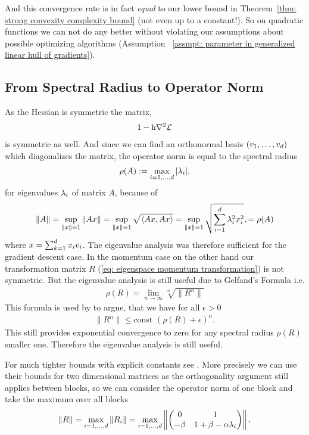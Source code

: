 And this convergence rate is in fact \emph{equal} to our lower bound  in
Theorem~\ref{thm: strong convexity complexity bound} (not even up to a
constant!). So on quadratic functions we can not do any better without violating
our assumptions about possible optimizing algorithms (Assumption~ \ref{assmpt:
parameter in generalized linear hull of gradients}).

\subsection{From Spectral Radius to Operator Norm}

As the Hessian is symmetric the matrix,
\begin{align*}
	1-\text{h} \nabla^2\mathcal{L}
\end{align*}
is symmetric as well. And since we can find an orthonormal basis \((v_1,\dots,
v_d)\) which diagonalizes the matrix, the operator norm is equal
to the spectral radius
\begin{align*}
	\rho(A)
	:= \max_{i=1,\dots,d} |\lambda_i|,
\end{align*}
for eigenvalues \(\lambda_i\) of matrix \(A\), because of
\begin{align*}
	\|A\| = \sup_{\|x\| =1} \|Ax\|
	= \sup_{\|x\| =1} \sqrt{\langle Ax, Ax\rangle}
	= \sup_{\|x\| =1} \sqrt{\sum_{i=1}^d \lambda_i^2 x_i^2},
	= \rho(A)
\end{align*}
where \(x=\sum_{k=1}^d x_i v_i\). The eigenvalue analysis was therefore
sufficient for the gradient descent case. In the momentum case on the other
hand our transformation matrix \(R\) (\ref{eq: eigenspace momentum transformation})
is not symmetric. But the eigenvalue analysis is still useful due to Gelfand's Formula
\parencite{gelfandNormierteRinge1941} i.e.
\begin{align*}
	\rho(R) = \lim_{n\to\infty}\sqrt[n]{\|R^n\|}
\end{align*}
This formula is used by \textcite[p. 38, Lemma 1]{polyakIntroductionOptimization1987}
to argue, that we have for all \(\epsilon>0\)
\begin{align*}
	\|R^n\|\le \text{const } (\rho(R) + \epsilon)^n.
\end{align*}
This still provides exponential convergence to zero for any spectral radius
\(\rho(R)\) smaller one. Therefore the eigenvalue analysis is still useful.

For much tighter bounds with explicit constants see
\textcite{kozyakinAccuracyApproximationSpectral2009}. More precisely we can use
their bounds for two dimensional matrices as the orthogonality argument still
applies between blocks, so we can consider the operator norm of one block and
take the maximum over all blocks
\begin{align*}
	\|R\| = \max_{i=1,\dots,d}\|R_i\|
	= \max_{i=1,\dots,d}\left\|
	\begin{pmatrix}
		0 & 1 \\
		-\beta & 1+\beta-\alpha\lambda_i
	\end{pmatrix}
	\right\|.
\end{align*}

